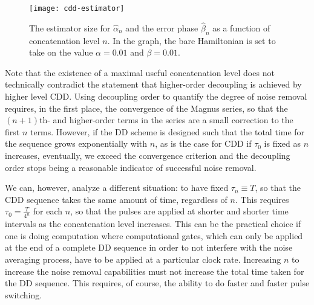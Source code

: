 \documentclass[twocolumn,pra,superscriptaddress]{revtex4-2}
\begin{document}
\begin{figure}
    \texttt{[image: cdd-estimator]}
    \caption{The estimator size for $\widehat \alpha_n$ and the error phase $\widehat \beta_n$ as a function of concatenation level $n$. In the graph, the bare Hamiltonian is set to take on the value $\alpha=0.01$ and $\beta=0.01$.}
    \label{fig:estimator-size}
\end{figure}


Note that the existence of a maximal useful concatenation level does not technically contradict the statement that 
higher-order decoupling is achieved by higher level CDD. Using decoupling order to quantify the degree of noise removal requires, in the first place, the convergence of the Magnus series, so that the $(n+1)$th- and higher-order terms in the series are a small correction to the first $n$ terms. However, if the DD scheme is designed such that the total time for the sequence grows exponentially with $n$, as is the case for CDD if $\tau_0$ is fixed as $n$ increases, eventually, we exceed the convergence criterion and the decoupling order stops being a reasonable indicator of successful noise removal. 

We can, however, analyze a different situation: to have fixed $\tau_n\equiv T$, so that the CDD sequence takes the same amount of time, regardless of $n$. This requires $\tau_0=\frac{T}{4^n}$ for each $n$, so that the pulses are applied at shorter and shorter time intervals as the concatenation level increases. This can be the practical choice if one is doing computation where computational gates, which can only be applied at the end of a complete DD sequence in order to not interfere with the noise averaging process, have to be applied at a particular clock rate. Increasing $n$ to increase the noise removal capabilities must not increase the total time taken for the DD sequence. This requires, of course, the ability to do faster and faster pulse switching.
\end{document}
